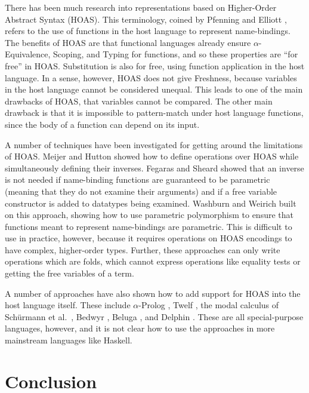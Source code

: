 \documentclass[natbib]{sigplanconf}
\begin{document}
There has been much research into representations based on
Higher-Order Abstract Syntax (HOAS). This terminology, coined by
Pfenning and Elliott \cite{pe88}, refers to the use of functions in the
host language to represent name-bindings. The benefits of HOAS are
that functional languages already ensure $\alpha$-Equivalence,
Scoping, and Typing for functions, and so these properties are ``for
free'' in HOAS.  Substitution is also for free, using function
application in the host language.  In a sense, however, HOAS does not
give Freshness, because variables in the host language cannot be
considered unequal. This leads to one of the main drawbacks of HOAS,
that variables cannot be compared. The other main drawback is that it
is impossible to pattern-match under host language functions, since
the body of a function can depend on its input.

A number of techniques have been investigated for getting around the
limitations of HOAS. Meijer and Hutton \cite{meijer-hutton95} showed
how to define operations over HOAS while simultaneously defining their
inverses.  Fegaras and Sheard \cite{fegaras96} showed that an inverse
is not needed if name-binding functions are guaranteed to be
parametric (meaning that they do not examine their arguments) and if a
free variable constructor is added to datatypes being examined.
Washburn and Weirich \cite{washburn03} built on this approach, showing
how to use parametric polymorphism to ensure that functions meant to
represent name-bindings are parametric. This is difficult to use in
practice, however, because it requires operations on HOAS encodings to
have complex, higher-order types.  Further, these approaches can only
write operations which are folds, which cannot express operations like
equality tests or getting the free variables of a term.

A number of approaches have also shown how to add support for HOAS
into the host language itself. These include $\alpha$-Prolog
\cite{miller91}, Twelf \cite{PfS98}, the modal calculus of
Sch\"{u}rmann et al.~\cite{schurmann01}, Bedwyr \cite{baelde07},
Beluga \cite{pientka08}, and Delphin \cite{poswolsky08}. These are all
special-purpose languages, however, and it is not clear how to use the
approaches in more mainstream languages like Haskell.




\section{Conclusion}
\label{sec:conclusion}
\end{document}
